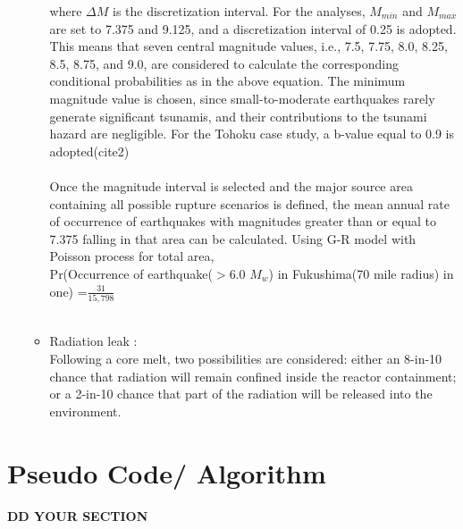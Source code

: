 \documentclass{article}
\begin{document}
\begin{itemize}
\begin{itemize}
where $\Delta M$ is the discretization interval. 
For the analyses, $M_{min}$ and $M_{max}$ are set to 7.375 and 9.125, and a discretization interval of 0.25 is adopted. This means that seven central magnitude values, i.e., 7.5, 7.75, 8.0, 8.25, 8.5, 8.75, and 9.0, are considered to calculate the corresponding conditional probabilities as in the above equation. The minimum magnitude value is chosen, since small-to-moderate earthquakes rarely generate significant tsunamis, and their contributions to the tsunami hazard are negligible. For the Tohoku case study, a b-value equal to 0.9 is adopted(cite2)\\ %
\\ %
Once the magnitude interval is selected and the major source area containing all possible rupture scenarios is defined, the mean annual rate of occurrence of earthquakes with magnitudes greater than or equal to 7.375 falling in that area can be calculated. Using G-R model with Poisson process for total area,\\
Pr(Occurrence of earthquake($>$6.0 $M_{w}$) in Fukushima(70 mile radius) in one) =$\frac{31}{15,798}$  %
\\
\\

 \item Radiation leak :\\
 Following a core melt, two possibilities are considered:
either an 8-in-10 chance that radiation will remain confined inside the reactor
containment; or a 2-in-10 chance that part of the radiation will be released into the environment.%
    
    
   
 \end{itemize}
\end{itemize}

\section{Pseudo Code/ Algorithm }
\textbf{DD YOUR SECTION}
\end{document}
